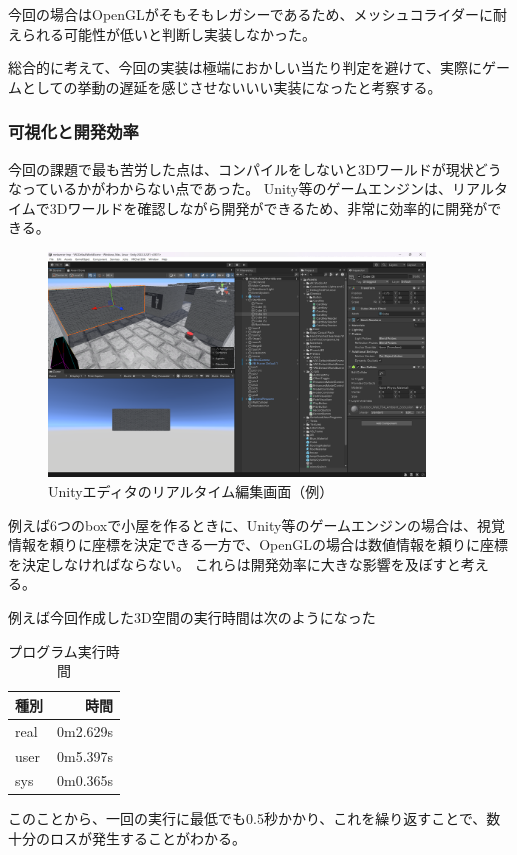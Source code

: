 \documentclass[uplatex,dvipdfmx,a4paper]{jsarticle}
\begin{document}
今回の場合はOpenGLがそもそもレガシーであるため、メッシュコライダーに耐えられる可能性が低いと判断し実装しなかった。

総合的に考えて、今回の実装は極端におかしい当たり判定を避けて、実際にゲームとしての挙動の遅延を感じさせないいい実装になったと考察する。

\subsubsection{可視化と開発効率}

今回の課題で最も苦労した点は、コンパイルをしないと3Dワールドが現状どうなっているかがわからない点であった。
Unity等のゲームエンジンは、リアルタイムで3Dワールドを確認しながら開発ができるため、非常に効率的に開発ができる。
\begin{figure}[H]
    \centering
    \includegraphics[width=10cm]{unity.png}
    \caption{Unityエディタのリアルタイム編集画面（例）}
    \label{fig:unity_editor}
\end{figure}
例えば6つのboxで小屋を作るときに、Unity等のゲームエンジンの場合は、視覚情報を頼りに座標を決定できる一方で、OpenGLの場合は数値情報を頼りに座標を決定しなければならない。
これらは開発効率に大きな影響を及ぼすと考える。

例えば今回作成した3D空間の実行時間は次のようになった
\begin{table}[H]
    \centering
    \caption{プログラム実行時間}
    \label{tab:execution_time}
    \begin{tabular}{lr}
    \toprule
    種別 & 時間 \\
    \midrule
    real & 0m2.629s \\
    user & 0m5.397s \\
    sys  & 0m0.365s \\
    \bottomrule
    \end{tabular}
\end{table}
このことから、一回の実行に最低でも0.5秒かかり、これを繰り返すことで、数十分のロスが発生することがわかる。
\end{document}
